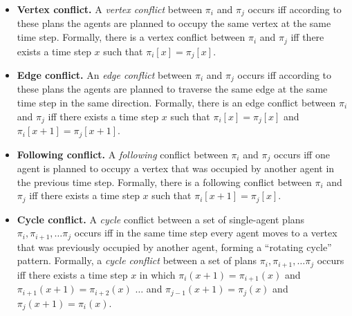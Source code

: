 \documentclass[letterpaper]{article} %
\newcommand{\comment}[1]{{\nb{\textbf{Comment:}}{orange}{#1}}}
\begin{document}
\begin{itemize}
\item \textbf{Vertex conflict.} A \emph{vertex conflict} between $\pi_i$ and $\pi_j$ occurs iff  according to these plans the agents are planned to occupy the same vertex at the same time step. 
Formally, there is a vertex conflict between $\pi_i$ and $\pi_j$ iff there exists a time step $x$ such that 
$\pi_i[x]=\pi_j[x]$. 

\item \textbf{Edge conflict.} An \emph{edge conflict} between $\pi_i$ and $\pi_j$ occurs iff 
according to these plans the agents are planned to traverse the same edge at the same time step in the same direction. 
Formally, there is an edge conflict between $\pi_i$ and $\pi_j$ iff there exists a time step $x$ such that 
$\pi_i[x]=\pi_j[x]$ and $\pi_i[x+1]=\pi_j[x+1]$.

 

\item \textbf{Following conflict.} A \emph{following} conflict between $\pi_i$ and $\pi_j$ occurs iff
one agent is planned to occupy a vertex that was occupied by another agent in the previous time step. 
Formally, there is a following conflict between $\pi_i$ and $\pi_j$ iff there exists a time step $x$ such that 
$\pi_i[x+1]=\pi_j[x]$. 


\item \textbf{Cycle conflict.} A \emph{cycle} conflict  between a set of single-agent plans $\pi_i, \pi_{i+1}, \ldots \pi_j$ occurs iff
in the same time step every agent moves to a vertex that was previously occupied by another agent, forming a ``rotating cycle'' pattern. Formally, a \emph{cycle conflict} between a set of plans $\pi_i, \pi_{i+1}, \ldots \pi_j$ 
occurs iff there exists a time step $x$ in which 
$\pi_i(x+1)=\pi_{i+1}(x)$  
and $\pi_{i+1}(x+1)=\pi_{i+2}(x)$ 
$\ldots$ 
and $\pi_{j-1}(x+1)=\pi_j(x)$ 
and $\pi_j(x+1)=\pi_i(x)$. 



\end{itemize}
\end{document}
